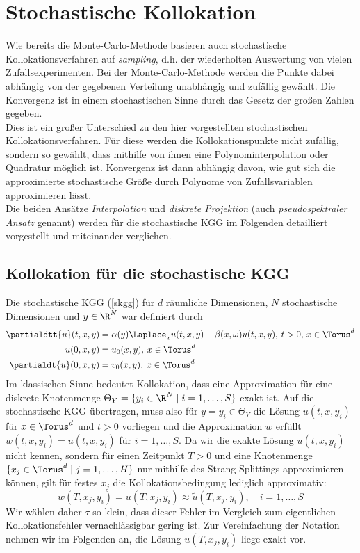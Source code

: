 
\chapter{Stochastische Kollokation}
\label{Chapter4}
Wie bereits die Monte-Carlo-Methode basieren auch stochastische Kollokationsverfahren auf \emph{sampling}, d.h. der wiederholten Auswertung von vielen Zufallsexperimenten. Bei der Monte-Carlo-Methode werden die Punkte dabei abhängig von der gegebenen Verteilung unabhängig und zufällig gewählt. Die Konvergenz ist in einem stochastischen Sinne durch das Gesetz der großen Zahlen gegeben.\\
Dies ist ein großer Unterschied zu den hier vorgestellten stochastischen Kollokationsverfahren. Für diese werden die Kollokationspunkte nicht zufällig, sondern so gewählt, dass mithilfe von ihnen eine Polynominterpolation oder Quadratur möglich ist. Konvergenz ist dann abhängig davon, wie gut sich die approximierte stochastische Größe durch Polynome von Zufallsvariablen approximieren lässt.\\
Die beiden Ansätze \emph{Interpolation} und \emph{diskrete Projektion} (auch \emph{pseudospektraler Ansatz} genannt) werden für die stochastische KGG im Folgenden detailliert vorgestellt und miteinander verglichen.
\section*{Kollokation für die stochastische KGG}
Die stochastische KGG (\ref{skgg}) für $d$ räumliche Dimensionen, $N$ stochastische Dimensionen und $y\in\R^N$ war definiert durch
\begin{align*}
\partialdtt{u}(t,x,y)&=\alpha(y) \Laplace_x u(t,x,y) - \beta(x,\omega)u(t,x,y), \: t>0, \, x\in \Torus^d\\
u(0,x,y)&=u_0(x,y), \: x\in \Torus^d\\
\partialdt{u}(0,x,y)&=v_0(x,y), \: x\in \Torus^d
\end{align*}
Im klassischen Sinne bedeutet Kollokation, dass eine Approximation für eine diskrete Knotenmenge $\Theta_Y=\lbrace y_i\in\R^N\mid i=1,\dots,S\rbrace$ exakt ist. Auf die stochastische KGG übertragen, muss also für $y=y_i\in\Theta_Y$ die Lösung $u(t,x,y_i)$ für $x\in\Torus^d$ und $t>0$ vorliegen und die Approximation $w$ erfüllt $w(t,x,y_i)=u(t,x,y_i)$ für $i=1,\dots,S$. Da wir die exakte Lösung $u(t,x,y_i)$ nicht kennen, sondern für einen Zeitpunkt $T>0$ und eine Knotenmenge $\lbrace x_j\in\Torus^d\mid j=1,\dots,H\rbrace$ nur mithilfe des Strang-Splittings approximieren können, gilt für festes $x_j$ die Kollokationsbedingung lediglich approximativ:
\[w(T,x_j,y_i)=u(T,x_j,y_i)\approx \tilde{u}(T,x_j,y_i),\quad i=1,\dots,S\]
Wir wählen daher $\tau$ so klein, dass dieser Fehler im Vergleich zum eigentlichen Kollokationsfehler vernachlässigbar gering ist. Zur Vereinfachung der Notation nehmen wir im Folgenden an, die Lösung $u(T,x_j,y_i)$ liege exakt vor.

